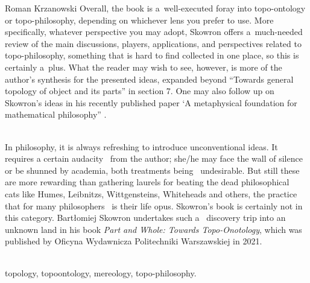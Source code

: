 \begin{newrevengenv}{Roman Krzanowski}
Overall, the book is a~well-executed foray into topo-ontology or topo-philosophy, depending on whichever lens you prefer to use. More specifically, whatever perspective you may adopt, Skowron offers a~much-needed review of the main discussions, players, applications, and perspectives related to topo-philosophy, something that is hard to find collected in one place, so this is certainly a~plus. What the reader may wish to see, however, is more of the author's synthesis for the presented ideas, expanded beyond ``Towards general topology of object and its parts'' in section 7. One may also follow up on Skowron's ideas in his recently published paper ‘A metaphysical foundation for mathematical philosophy'' 
\parencite[][]{wojtowicz_metaphysical_2022}.%



\vspace{15mm}%
{}\\
{In philosophy, it is always refreshing to introduce unconventional ideas. It requires a certain audacity  from the author; she/he may face the wall of silence or be shunned by academia, both treatments being  undesirable. But still these are more rewarding than gathering laurels for beating the dead philosophical  cats like Humes, Leibnitzs, Wittgensteins, Whiteheads and others, the practice that for many philosophers  is their life opus. Skowron’s book is certainly not in this category. Bartłomiej Skowron undertakes such a  discovery trip into an unknown land in his book \textit{Part and Whole: Towards Topo-Onotology}, which was published by Oficyna Wydawnicza Politechniki Warszawskiej in 2021.}\par%
\vspace{2mm}%
{}\\
{topology, topoontology, mereology, topo-philosophy.}%



\end{newrevengenv}

